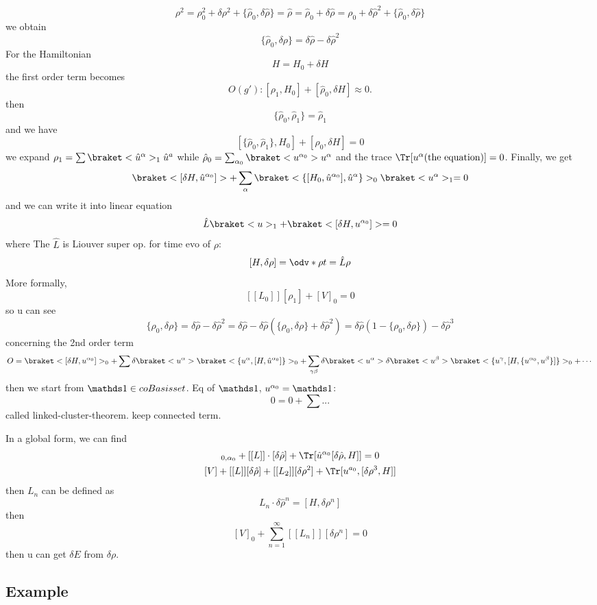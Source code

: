 \[
  \rho^2 = \rho_0^2 + \delta\rho^2 + \{\hat\rho_0,\delta\hat\rho\}
= \hat\rho = \hat\rho_0 + \delta\hat\rho
= \rho_0 + \delta\hat\rho^2 + \{\hat\rho_0, \delta\hat\rho\}
\]
we obtain
\[
  \{\hat\rho_0,\delta\rho\} = \delta\hat\rho - \delta\hat\rho^2
\]
For the Hamiltonian
\[
  H = H_0 + \delta H
\]
the first order term becomes
\[
  O(g'): [\rho_1,H_0] + [\hat\rho_0,\delta H] \approx 0.
\]
then
\[
  \{\hat \rho_0, \hat\rho_1\} = \hat\rho_1
\]
and we have
\[
  [\{\hat\rho_0,\hat\rho_1\}, H_0] + [\hat\rho_0,\delta H] = 0
\]
we expand $\rho_1 = \sum\braket<\hat u^\alpha>_1 \hat u^a$
while $\hat \rho_0 = \sum_{\alpha_0} \braket<u^{\alpha_0}>u^\alpha$
and the trace $\Tr[u^{\alpha}(\text{the equation})] = 0$.
Finally, we get
\[
  \braket<[\delta H, \hat u^{\alpha_0}]> + \sum_\alpha\braket<\{[H_0, \hat u^{\alpha_0}], \hat u^\alpha\}>_0 \braket<u^\alpha>_1 = 0
\]
and we can write it into linear equation
\[
  \hat L \braket<u>_1 + \braket<[\delta H, u^{\alpha_0}]> = 0
\]
where
The $\hat L$ is Liouver super op.
for time evo of $\rho$:
\[
  [H,\delta\rho] = \odv*{\rho}t
= \hat L \rho
\]
More formally,
\[
  [[L_0]] [\rho_1] + [V]_0 = 0
\]
so u can see
\[
  \{\rho_0,\delta\rho\} = \delta\hat\rho - \delta\hat\rho^2
= \delta\hat\rho - \delta\hat\rho(\{\rho_0,\delta\rho\}+\delta\hat\rho^2)
= \delta\hat\rho(1 - \{\rho_0,\delta\rho\}) - \delta\hat\rho^3
\]
concerning the 2nd order term
\[
  O = \braket<[\delta H,u^{\alpha_0}]>_0
    + \sum\delta\braket<u^\alpha>\braket<\{u^\alpha,[H,\hat u^{\alpha_0}]\}>_0
    + \sum_{\gamma\beta} \delta\braket<u^\alpha> \delta \braket<u^\beta>
      \braket<\{u^\gamma, [H,\{u^{\alpha_0}, u^\beta\}]\}>_0 + \cdots
\]
then we start from
$\identity \in co Basis set$. Eq of $\identity$, $u^{\alpha_0} = \identity$:
\[
  0 = 0 + \sum ...
\]
called linked-cluster-theorem. keep connected term.

In a global form, we can find
\begin{gather*}
  [V]_{0,\alpha_0} + [[L]] \cdot[\delta\hat \rho] + \Tr[\hat u^{\alpha_0}[\delta\hat\rho,H]] = 0\\
  [V] + [[L]][\delta\hat\rho] + [[L_2]][\delta\rho^2] + \Tr[u^{a_0}, [\delta\rho^3,H]]
\end{gather*}
then $L_n$ can be defined as
\[
  L_n \cdot \delta\hat\rho^n = [H,\delta\rho^n]
\]
then
\[
  [V]_0 + \sum_{n=1}^\infty [[L_n]][\delta\rho^n] = 0
\]
then u can get $\delta E$ from $\delta \rho$.

\subsection{Example}

